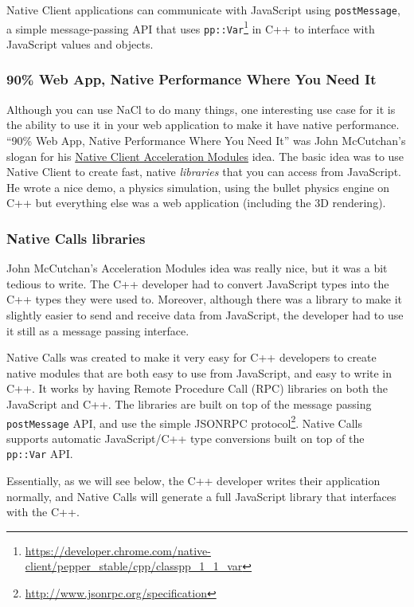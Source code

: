 \documentclass[]{article}
\begin{document}
Native Client applications can communicate with JavaScript using
\texttt{postMessage}, a simple message-passing API that uses
\texttt{pp::Var}\footnote{\url{https://developer.chrome.com/native-client/pepper_stable/cpp/classpp_1_1_var}}
in C++ to interface with JavaScript values and objects.

\subsubsection{90\% Web App, Native Performance Where You Need
It}\label{web-app-native-performance-where-you-need-it}

Although you can use NaCl to do many things, one interesting use case
for it is the ability to use it in your web application to make it have
native performance. ``90\% Web App, Native Performance Where You Need
It'' was John McCutchan's slogan for his
\href{http://www.johnmccutchan.com/2012/10/bullet-native-client-acceleration-module.html}{Native
Client Acceleration Modules} idea. The basic idea was to use Native
Client to create fast, native \emph{libraries} that you can access from
JavaScript. He wrote a nice demo, a physics simulation, using the bullet
physics engine on C++ but everything else was a web application
(including the 3D rendering).

\subsubsection{Native Calls libraries}\label{native-calls-libraries}

John McCutchan's Acceleration Modules idea was really nice, but it was a
bit tedious to write. The C++ developer had to convert JavaScript types
into the C++ types they were used to. Moreover, although there was a
library to make it slightly easier to send and receive data from
JavaScript, the developer had to use it still as a message passing
interface.

Native Calls was created to make it very easy for C++ developers to
create native modules that are both easy to use from JavaScript, and
easy to write in C++. It works by having Remote Procedure Call (RPC)
libraries on both the JavaScript and C++. The libraries are built on top
of the message passing \texttt{postMessage} API, and use the simple
JSONRPC protocol\footnote{\url{http://www.jsonrpc.org/specification}}. Native
Calls supports automatic JavaScript/C++ type conversions built on top of
the \texttt{pp::Var} API.

Essentially, as we will see below, the C++ developer writes their
application normally, and Native Calls will generate a full JavaScript
library that interfaces with the C++.
\end{document}
